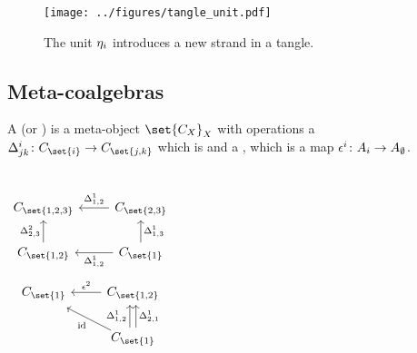 \documentclass{beamer}
\begin{document}
\begin{frame}
        \begin{figure}
        \centering
        \texttt{[image: ../figures/tangle\_unit.pdf]}
        \caption{The unit $\eta_i$ introduces a new strand in a tangle.}
        \label{fig:tangle_unit}
\end{figure}
\end{frame}

\subsection{Meta-coalgebras}

\begin{frame}
        \begin{definition}
                A  (or ) is a meta-object
                $\set{C_X}_X$ with operations a 
                $\map {\comult^{i}_{jk}} {C_{\set{i}}} {C_{\set{j,k}}}$ which is
                 and a , which is a
                map $\map {\counit^{i}} {A_{i}} {A_{\emptyset}}$.
        \end{definition}
        \begin{columns}
        \begin{equation*}\label{eq:cd_comult}
        \begin{tikzcd}[ampersand replacement=\&]
                C_{\set{1,2,3}}
                \&C_{\set{2,3}}
                        \lar["\comult^{1}_{{1,2}}"'] \\
                C_{\set{1,2}}
                        \uar["\comult^{2}_{2,3}"]
                \&C_{\set{1}}
                        \lar["\comult^{1}_{1,2}"]
                        \uar["\comult^{1}_{1,3}"']
        \end{tikzcd}
        \end{equation*}
        \begin{equation*}\label{eq:cd_counit}
        \begin{tikzcd}[ampersand replacement=\&]
                C_{\set{1}}
                \&C_{\set{1,2}}
                        \lar["\counit^{2}"']\\
                \&C_{\set{1}}
                        \ular["\id", shift left]
                        \uar["\comult^{1}_{1,2}", shift left]
                        \uar["\comult^{1}_{2,1}"', shift right] \\
        \end{tikzcd}
        \end{equation*}
        \end{columns}
\end{frame}
\end{document}
